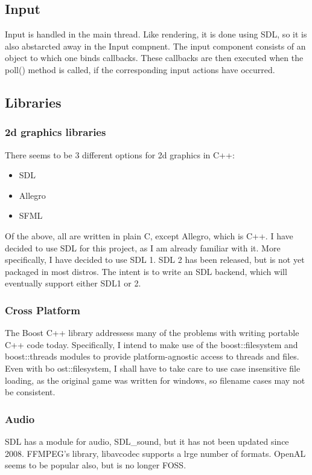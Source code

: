     \subsection{Input}
    Input is handled in the main thread. Like rendering, it is done using SDL, so it is also abstarcted away in the Input compnent.
    The input component consists of an object to which one binds callbacks. These callbacks are then executed when the poll() method is called, if the corresponding input actions have occurred.

    
    \subsection{Libraries}
        \subsubsection{2d graphics libraries}
    	There seems to be 3 different options for 2d graphics in C++:
    	\begin{itemize}
    	    \item{SDL}
    	    \item{Allegro}
    	    \item{SFML}
    	\end{itemize}
    	
    	Of the above, all are written in plain C, except Allegro, which is C++.
    	I have decided to use SDL for this project, as I am already familiar with it.
    	More specifically, I have decided to use SDL 1.
    	SDL 2 has been released, but is not yet packaged in most distros. 
    	The intent is to write an SDL backend, which will eventually support either SDL1 or 2.
    	
    	\subsubsection{Cross Platform}
        The Boost C++ library addressess many of the problems with writing portable C++ code today.
        Specifically, I intend to make use of the boost::filesystem and boost::threads modules to provide platform-agnostic access to threads and files.
        Even with bo	ost::filesystem, I shall have to take care to use case insensitive file loading, as the original game was written for windows, so filename cases may not be consistent.
        
        \subsubsection{Audio}
        SDL has a module for audio, SDL\_sound\cite{sdls}, but it has not been updated since 2008.
        FFMPEG's library, libavcodec\cite{libavcodec} supports a lrge number of formats.
        OpenAL seems to be popular also, but is no longer FOSS.